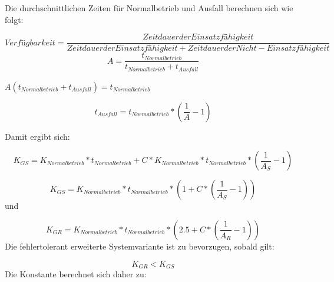 \documentclass[10pt,a4paper]{article}
\begin{document}
\bigskip

Die durchschnittlichen Zeiten f\"ur Normalbetrieb und Ausfall berechnen sich wie folgt:


\bigskip

\begin{equation*}
\mathit{Verf\text{\"u}gbarkeit}=\frac{\mathit{Zeitdauer}\mathit{der}\mathit{Einsatzf\text{\"a}higkeit}}{\mathit{Zeitdauer}\mathit{der}\mathit{Einsatzf\text{\"a}higkeit}+\mathit{Zeitdauer}\mathit{der}\mathit{Nicht}-\mathit{Einsatzf\text{\"a}higkeit}}
\end{equation*}
\begin{equation*}
A=\frac{t_{\mathit{Normalbetrieb}}}{t_{\mathit{Normalbetrieb}}+t_{\mathit{Ausfall}}}
\end{equation*}

$A(t_{\mathit{Normalbetrieb}}+t_{\mathit{Ausfall}})=t_{\mathit{Normalbetrieb}}$


\begin{equation*}
t_{\mathit{Ausfall}}=t_{\mathit{Normalbetrieb}}\ast (\frac{1}{A}-1)
\end{equation*}

\bigskip

Damit ergibt sich:


\bigskip

\begin{equation*}
K_{\mathit{GS}}=K_{\mathit{Normalbetrieb}}\ast
t_{\mathit{Normalbetrieb}}+C\ast K_{\mathit{Normalbetrieb}}\ast
t_{\mathit{Normalbetrieb}}\ast (\frac{1}{A_{S}}-1)
\end{equation*}

\bigskip

\begin{equation*}
K_{\mathit{GS}}=K_{\mathit{Normalbetrieb}}\ast
t_{\mathit{Normalbetrieb}}\ast (1+C\ast (\frac{1}{A_{S}}-1))
\end{equation*}
und


\bigskip

\begin{equation*}
K_{\mathit{GR}}=K_{\mathit{Normalbetrieb}}\ast
t_{\mathit{Normalbetrieb}}\ast (2.5+C\ast (\frac{1}{A_{R}}-1))
\end{equation*}
Die fehlertolerant erweiterte Systemvariante ist zu bevorzugen, sobald gilt:


\bigskip

\begin{equation*}
K_{\mathit{GR}}<K_{\mathit{GS}}
\end{equation*}
Die Konstante berechnet sich daher zu:
\end{document}
